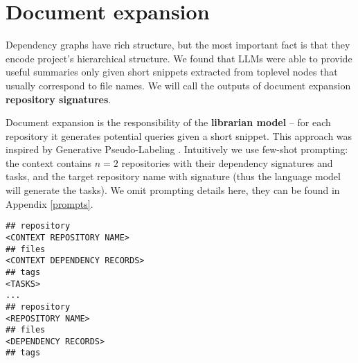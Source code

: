 \section{Document expansion}
\label{approach_document_expansion}
Dependency graphs have rich structure, but the most important fact is that they encode project's hierarchical structure. We found that LLMs were able to provide useful summaries only given short snippets extracted from toplevel nodes that usually correspond to file names. We will call the outputs of document expansion \textbf{repository signatures}.

Document expansion is the responsibility of the \textbf{librarian model} -- for each repository it generates potential queries given a short snippet. This approach was inspired by Generative Pseudo-Labeling \cite{gpl}. Intuitively we use few-shot prompting: the context contains $n=2$ repositories with their dependency signatures and tasks, and the target repository name with signature (thus the language model will generate the tasks). We omit prompting details here, they can be found in Appendix \ref{prompts}.

\begin{samepage}
\begin{lstlisting}[caption=Few-shot prompt format]
## repository
<CONTEXT REPOSITORY NAME>
## files
<CONTEXT DEPENDENCY RECORDS>
## tags
<TASKS>
...
## repository
<REPOSITORY NAME>
## files
<DEPENDENCY RECORDS>
## tags
\end{lstlisting}
\end{samepage}

